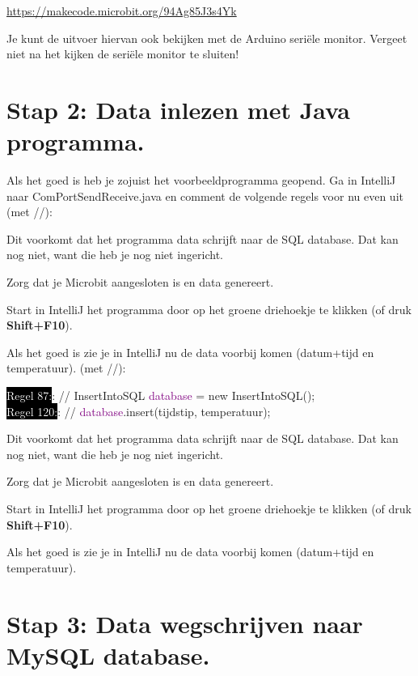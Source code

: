  \href{https://makecode.microbit.org/_94Ag85J3s4Yk}{https://makecode.microbit.org/94Ag85J3s4Yk}

Je kunt de uitvoer hiervan ook bekijken met de Arduino seriële monitor. 
Vergeet niet na het kijken de seriële monitor te sluiten!

\section{Stap 2: Data inlezen met Java programma.}

Als het goed is heb je zojuist het voorbeeldprogramma geopend.
Ga in IntelliJ naar ComPortSendReceive.java en comment de volgende regels voor nu even uit 
(met //):

Dit voorkomt dat het programma data schrijft naar de SQL database. Dat kan nog niet, want die heb je nog niet ingericht.

Zorg dat je Microbit aangesloten is en data genereert.

Start in IntelliJ het programma door op het groene driehoekje te klikken (of druk \colorbox{mygray}{\textbf{Shift+F10}}).

Als het goed is zie je in IntelliJ nu de data voorbij komen (datum+tijd en temperatuur).
(met //):


\colorbox{arsenic}{
	\begin{minipage}{\textwidth}
		\colorbox{black}{\textcolor{white}{Regel 87:}}:  // InsertIntoSQL \textcolor{purple}{database} = new InsertIntoSQL();\\
	
		\colorbox{black}{\textcolor{white}{Regel 120:}}:  // \textcolor{purple}{database}.insert(tijdstip, temperatuur);
		
	\end{minipage}
}


Dit voorkomt dat het programma data schrijft naar de SQL database. Dat kan nog niet, want die heb je nog niet ingericht.

Zorg dat je Microbit aangesloten is en data genereert.

Start in IntelliJ het programma door op het groene driehoekje te klikken (of druk \colorbox{mygray}{\textbf{Shift+F10}}).

Als het goed is zie je in IntelliJ nu de data voorbij komen (datum+tijd en temperatuur).


\section{Stap 3: Data wegschrijven naar MySQL database.}

